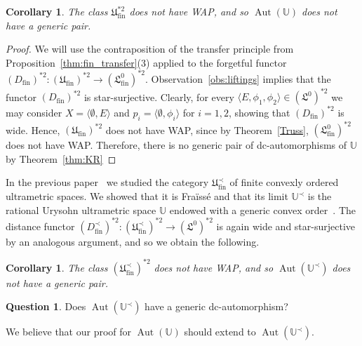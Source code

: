 \documentclass[oneside,notitlepage,12pt]{article}
\newtheorem{wn}[tw]{Corollary}
\theoremstyle{definition}
\newtheorem{question}[tw]{Question}
\theoremstyle{remark}
\newcommand \seq [1]{\langle #1 \rangle}
\newcommand \maps {\colon} %
\newcommand \U {\mathbb{U}}
\newcommand \fin {{\operatorname{fin}}}
\newcommand \Lin {\mathfrak{L}}
\newcommand \Ult {\mathfrak{U}}
\newcommand \UltConv {\Ult^\prec}
\newcommand \Aut {\operatorname{Aut}}
\let \aut \Aut
\begin{document}
\begin{wn} \label{cor:no_generic_pair}
    The class $\Ult_\fin^{*2}$ does not have WAP, and so $\aut(\U)$ does not have a generic pair.
\end{wn}
\begin{proof}
    We will use the contraposition of the transfer principle from Proposition~\ref{thm:fin_transfer}(3) applied to the forgetful functor $(D_\fin)^{*2}\maps (\Ult_\fin)^{*2} \to (\Lin^0_\fin)^{*2}$.
    Observation~\ref{obs:liftings} implies that the functor $(D_\fin)^{*2}$ is star-surjective.
    Clearly, for every $\seq{E, \phi_1, \phi_2} \in (\Lin^0)^{*2}$ we may consider $X = \seq{\emptyset, E}$ and $p_i = \seq{\emptyset, \phi_i}$ for $i = 1, 2$, showing that $(D_\fin)^{*2}$ is wide.
    Hence, $(\Ult_\fin)^{*2}$ does not have WAP, since by Theorem~\ref{Truss}, $(\Lin^0_\fin)^{*2}$ does not have WAP.
    Therefore, there is no generic pair of dc-automorphisms of $\U$ by Theorem~\ref{thm:KR}
\end{proof}

In the previous paper~\cite[Section~3.3]{paper1} we studied the category $\UltConv_\fin$ of finite convexly ordered ultrametric spaces.
We showed that it is Fraïssé and that its limit $\U^\prec$ is the rational Urysohn ultrametric space $\U$ endowed with a generic convex order~\cite[Theorem~3.16]{paper1}.
The distance functor $(D^\prec_\fin)^{*2}\maps (\UltConv_\fin)^{*2} \to (\Lin^0)^{*2}$ is again wide and star-surjective by an analogous argument, and so we obtain the following.

\begin{wn} \label{cor:no_generic_pair_convex}
    The class $(\UltConv_\fin)^{*2}$ does not have WAP, and so $\aut(\U^\prec)$ does not have a generic pair.
\end{wn}

\begin{question} \label{que:generic_auto_convex}
Does  $\Aut(\U^\prec)$ have a generic dc-automorphism?
\end{question}

We believe that our proof for $\Aut(\U)$  should extend to $\Aut(\U^\prec)$.
\end{document}
